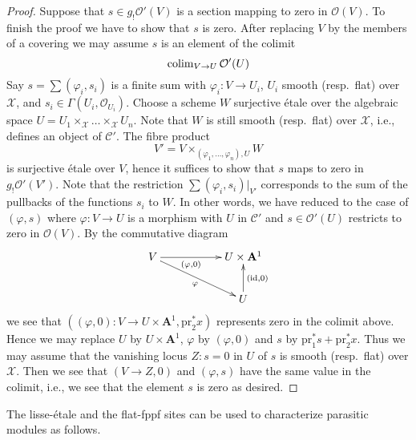 \begin{proof}
\medskip\noindent
Suppose that $s \in g_!\mathcal{O}'(V)$ is a section
mapping to zero in $\mathcal{O}(V)$. To finish the proof we have to show
that $s$ is zero. After replacing $V$ by the members
of a covering we may assume $s$ is an element of the colimit
$$
\mathop{\rm colim}\nolimits_{V \to U} \mathcal{O}'(U)
$$
Say $s = \sum (\varphi_i, s_i)$ is a finite sum with
$\varphi_i : V \to U_i$, $U_i$ smooth (resp.\ flat) over $\mathcal{X}$, and
$s_i \in \Gamma(U_i, \mathcal{O}_{U_i})$. Choose a scheme $W$ surjective
\'etale over the algebraic space
$U = U_1 \times_\mathcal{X} \ldots \times_\mathcal{X} U_n$.
Note that $W$ is still smooth (resp.\ flat) over $\mathcal{X}$, i.e.,
defines an object of $\mathcal{C}'$. The fibre product
$$
V' = V \times_{(\varphi_1, \ldots, \varphi_n), U} W
$$
is surjective \'etale over $V$, hence it suffices to show that $s$ maps
to zero in $g_!\mathcal{O}'(V')$. Note that the restriction
$\sum (\varphi_i, s_i)|_{V'}$ corresponds to the sum of the pullbacks
of the functions $s_i$ to $W$. In other words, we have reduced to the case
of $(\varphi, s)$ where $\varphi : V \to U$ is a morphism with $U$ in
$\mathcal{C}'$ and $s \in \mathcal{O}'(U)$ restricts to zero in
$\mathcal{O}(V)$. By the commutative diagram
$$
\xymatrix{
V \ar[rr]_-{(\varphi, 0)} \ar[rrd]_\varphi & & U \times \mathbf{A}^1 \\
& & U \ar[u]_{(\text{id}, 0)}
}
$$
we see that
$((\varphi, 0) : V \to U \times \mathbf{A}^1, \text{pr}_2^*x)$
represents zero in the colimit above. Hence we may
replace $U$ by $U \times \mathbf{A}^1$, $\varphi$ by $(\varphi, 0)$
and $s$ by $\text{pr}_1^*s + \text{pr}_2^*x$. Thus we may assume that
the vanishing locus $Z : s = 0$ in $U$ of $s$ is smooth (resp.\ flat)
over $\mathcal{X}$. Then we see that $(V \to Z, 0)$ and $(\varphi, s)$
have the same value in the colimit, i.e., we see that the element $s$
is zero as desired.
\end{proof}

\noindent
The lisse-\'etale and the flat-fppf sites can be used to characterize
parasitic modules as follows.

